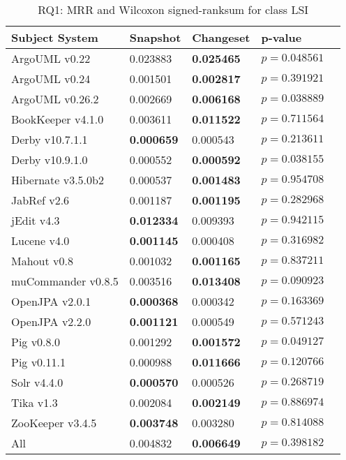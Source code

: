 
\begin{table}[t]
\renewcommand{\arraystretch}{1.3}
\footnotesize
\centering
\caption{RQ1: MRR and Wilcoxon signed-ranksum for class LSI}
\begin{tabular}{l|ll|ll}
   \toprule
    Subject System & Snapshot & Changeset & p-value  \\
    \midrule

ArgoUML v0.22 & 0.023883 & {\bf 0.025465 } & $p = 0.048561$ \\
ArgoUML v0.24 & 0.001501 & {\bf 0.002817 } & $p = 0.391921$ \\
ArgoUML v0.26.2 & 0.002669 & {\bf 0.006168 } & $p = 0.038889$ \\
BookKeeper v4.1.0 & 0.003611 & {\bf 0.011522 } & $p = 0.711564$ \\
Derby v10.7.1.1 & {\bf 0.000659 } & 0.000543 & $p = 0.213611$ \\
Derby v10.9.1.0 & 0.000552 & {\bf 0.000592 } & $p = 0.038155$ \\
Hibernate v3.5.0b2 & 0.000537 & {\bf 0.001483 } & $p = 0.954708$ \\
JabRef v2.6 & 0.001187 & {\bf 0.001195 } & $p = 0.282968$ \\
jEdit v4.3 & {\bf 0.012334 } & 0.009393 & $p = 0.942115$ \\
Lucene v4.0 & {\bf 0.001145 } & 0.000408 & $p = 0.316982$ \\
Mahout v0.8 & 0.001032 & {\bf 0.001165 } & $p = 0.837211$ \\
muCommander v0.8.5 & 0.003516 & {\bf 0.013408 } & $p = 0.090923$ \\
OpenJPA v2.0.1 & {\bf 0.000368 } & 0.000342 & $p = 0.163369$ \\
OpenJPA v2.2.0 & {\bf 0.001121 } & 0.000549 & $p = 0.571243$ \\
Pig v0.8.0 & 0.001292 & {\bf 0.001572 } & $p = 0.049127$ \\
Pig v0.11.1 & 0.000988 & {\bf 0.011666 } & $p = 0.120766$ \\
Solr v4.4.0 & {\bf 0.000570 } & 0.000526 & $p = 0.268719$ \\
Tika v1.3 & 0.002084 & {\bf 0.002149 } & $p = 0.886974$ \\
ZooKeeper v3.4.5 & {\bf 0.003748 } & 0.003280 & $p = 0.814088$ \\
\midrule
All & 0.004832 & {\bf 0.006649 } & $p = 0.398182$ \\

    \bottomrule
\end{tabular}
\label{table:rq1:class:lsi}
\end{table}

